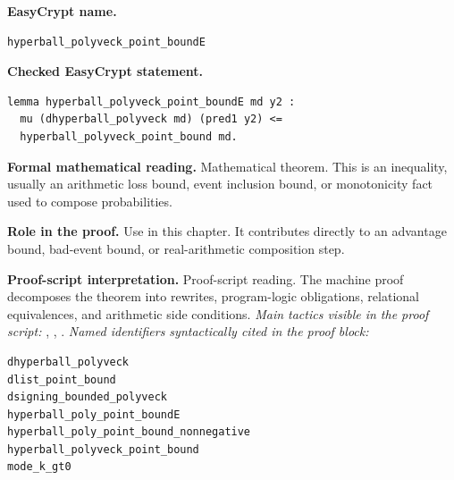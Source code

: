 \begin{formaltheorem}
\noindent\textbf{EasyCrypt name.}
\begin{lstlisting}[language=EasyCrypt,basicstyle=\ttfamily\scriptsize]
hyperball_polyveck_point_boundE
\end{lstlisting}
\noindent\textbf{Checked EasyCrypt statement.}
\begin{lstlisting}[language=EasyCrypt,basicstyle=\ttfamily\scriptsize]
lemma hyperball_polyveck_point_boundE md y2 :
  mu (dhyperball_polyveck md) (pred1 y2) <=
  hyperball_polyveck_point_bound md.
\end{lstlisting}
\noindent\textbf{Formal mathematical reading.}
Mathematical theorem. This is an inequality, usually an arithmetic loss bound, event inclusion bound, or monotonicity fact used to compose probabilities.

\noindent\textbf{Role in the proof.}
Use in this chapter. It contributes directly to an advantage bound, bad-event bound, or real-arithmetic composition step.

\noindent\textbf{Proof-script interpretation.}
Proof-script reading. The machine proof decomposes the theorem into rewrites, program-logic obligations, relational equivalences, and arithmetic side conditions.
\emph{Main tactics visible in the proof script:} , , .
\emph{Named identifiers syntactically cited in the proof block:}
\begin{lstlisting}[language=EasyCrypt,basicstyle=\ttfamily\scriptsize]
dhyperball_polyveck
dlist_point_bound
dsigning_bounded_polyveck
hyperball_poly_point_boundE
hyperball_poly_point_bound_nonnegative
hyperball_polyveck_point_bound
mode_k_gt0
\end{lstlisting}

\end{formaltheorem}

